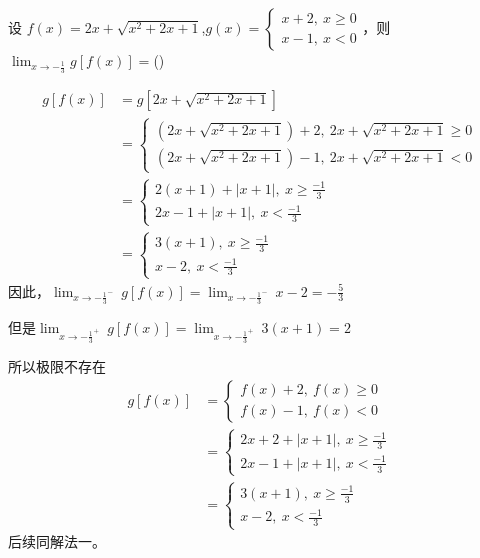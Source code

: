 \begin{Problem}
    设 $
        f(x)= 2x + \sqrt{x^2 + 2x + 1}
    $,\phantom{1em}$g(x)= \begin{cases}
        x + 2,\ x \ge 0\\
        x -1,\ x <0
    \end{cases} $，则$\lim_{x \rightarrow -\frac{1}{3}}g[f(x)]=$(\phantom{5em})
\end{Problem}
\begin{Answer}
    \[\begin{aligned}
        g[f(x)]&=g[2x+\sqrt{x^2+2x+1}]\\
        &=\begin{cases}
            (2x+\sqrt{x^2+2x+1})+2,\ 2x+\sqrt{x^2+2x+1} \geq 0\\
            (2x+\sqrt{x^2+2x+1})-1,\ 2x+\sqrt{x^2+2x+1} < 0
        \end{cases}\\
        &= \begin{cases}
            2(x+1)+|x+1|,\ x \ge \frac{-1}{3}\\
            2x-1+ |x+1|,\ x < \frac{-1}{3}
        \end{cases}\\
        &= \begin{cases}
            3(x+1),\ x \ge \frac{-1}{3}\\
            x-2,\ x <\frac{-1}{3}
        \end{cases}
    \end{aligned}
    \]
    因此，$\lim_{x\rightarrow -\frac{1}{3}^-}\ g[f(x)] =\lim_{x\rightarrow -\frac{1}{3}^-}\ x-2=-\frac{5}{3}  $\par
    但是$\lim_{x\rightarrow -\frac{1}{3}^+}\ g[f(x)] =\lim_{x\rightarrow -\frac{1}{3}^+}\ 3(x+1)=2 $\par
    所以极限不存在
    \[\begin{aligned}
        g[f(x)]&=\begin{cases}
            f(x)+2,\ f(x) \ge 0\\
            f(x)-1,\ f(x) < 0
        \end{cases}\\
        &=\begin{cases}
            2x+2+|x+1|,\ x \ge \frac{-1}{3}\\
            2x-1+|x+1|,\ x < \frac{-1}{3}
        \end{cases}\\
        &=\begin{cases}
            3(x+1),\ x \ge \frac{-1}{3}\\
            x-2,\ x < \frac{-1}{3}
        \end{cases}
    \end{aligned}
    \]
    后续同解法一。
\end{Answer}

